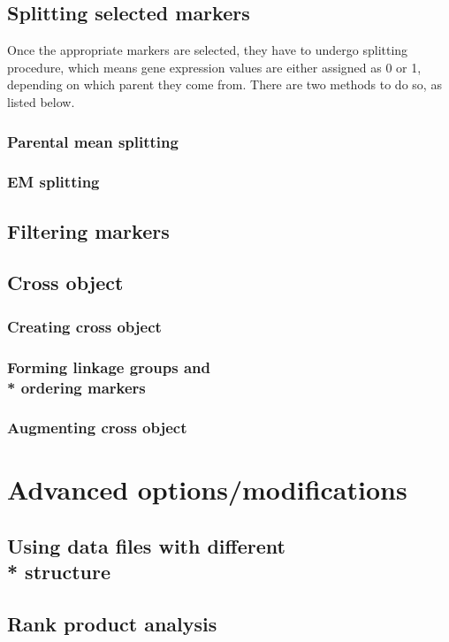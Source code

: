 \documentclass{article}
\begin{document}
\subsection{Splitting selected markers} 
{\noindent}Once the appropriate markers are selected, they have to undergo splitting procedure, which means gene expression values are either assigned as 0 or 1, depending on which parent they come from. There are two methods to do so, as listed below.
\subsubsection{Parental mean splitting}
\blindtext
\subsubsection{EM splitting}
\blindtext
\subsection{Filtering markers}
\blindtext
\subsection{Cross object}
\blindtext[2]
\subsubsection{Creating cross object}
\blindtext
\subsubsection{Forming linkage groups and \\* ordering markers}
\blindtext
\subsubsection{Augmenting cross object}
\blindtext

\newpage
\section{Advanced options/modifications}

\subsection{Using data files with different \\* structure}
\blindtext
\subsection{Rank product analysis}
\blindtext
\end{document}

